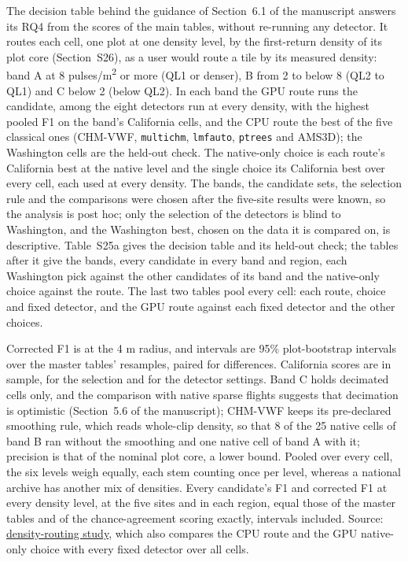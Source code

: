 \documentclass[10pt,a4paper]{article}
\makeatletter
\newcommand\suppFloatBarrier{\par\addpenalty\z@
  \ifx\@deferlist\@empty\else\expandafter\supp@flush\fi}
\newcommand\supp@flush{\let\supp@waiting\@deferlist
  \newpage
  \ifx\@deferlist\supp@waiting\null\newpage\fi
  \ifx\@deferlist\supp@waiting\expandafter\clearpage\else\expandafter\suppFloatBarrier\fi}
\gdef\supp@afterheading{}
\renewcommand\section{\suppFloatBarrier
    \gdef\supp@afterheading{\suppressfloats[t]\gdef\supp@afterheading{}}\supp@section}}
\makeatother
\begin{document}
\section*{S25. Density routing by band and region}

The decision table behind the guidance of Section~6.1 of the manuscript answers
its RQ4 from the scores of the main tables, without re-running any detector. It
routes each cell, one plot at one density level, by the first-return density of
its plot core (Section~S26), as a user would route a tile by its measured
density: band A at 8 pulses/m\textsuperscript{2} or more (QL1 or denser), B from 2 to below 8 (QL2
to QL1) and C below 2 (below QL2). In each band the GPU route runs the
candidate, among the eight detectors run at every density, with the highest
pooled F1 on the band's California cells, and the CPU route the best of the five
classical ones (CHM-VWF, \texttt{multichm}, \texttt{lmfauto}, \texttt{ptrees} and AMS3D); the
Washington cells are the held-out check. The native-only choice is each route's
California best at the native level and the single choice its California best
over every cell, each used at every density. The bands, the candidate sets, the
selection rule and the comparisons were chosen after the five-site results were
known, so the analysis is post hoc; only the selection of the detectors is blind
to Washington, and the Washington best, chosen on the data it is compared on, is
descriptive. Table~S25a gives the decision table and its held-out check; the
tables after it give the bands, every candidate in every band and region, each
Washington pick against the other candidates of its band and the native-only
choice against the route. The last two tables pool every cell: each route,
choice and fixed detector, and the GPU route against each fixed detector and the
other choices.

Corrected F1 is at the 4 m radius, and intervals are 95\% plot-bootstrap
intervals over the master tables' resamples, paired for differences. California
scores are in sample, for the selection and for the detector settings. Band C
holds decimated cells only, and the comparison with native sparse flights
suggests that decimation is optimistic (Section~5.6 of the manuscript); CHM-VWF
keeps its pre-declared smoothing rule, which reads whole-clip density, so that 8
of the 25 native cells of band B ran without the smoothing and one native cell
of band A with it; precision is that of the nominal plot core, a lower bound.
Pooled over every cell, the six levels weigh equally, each stem counting once
per level, whereas a national archive has another mix of densities. Every
candidate's F1 and corrected F1 at every density level, at the five sites and in
each region, equal those of the master tables and of the chance-agreement
scoring exactly, intervals included. Source: \href{https://github.com/devakellc/lidar-tree-benchmark/blob/main/results/density-routing-results.md}{density-routing
study}, which also compares the CPU route
and the GPU native-only choice with every fixed detector over all cells.
\end{document}
